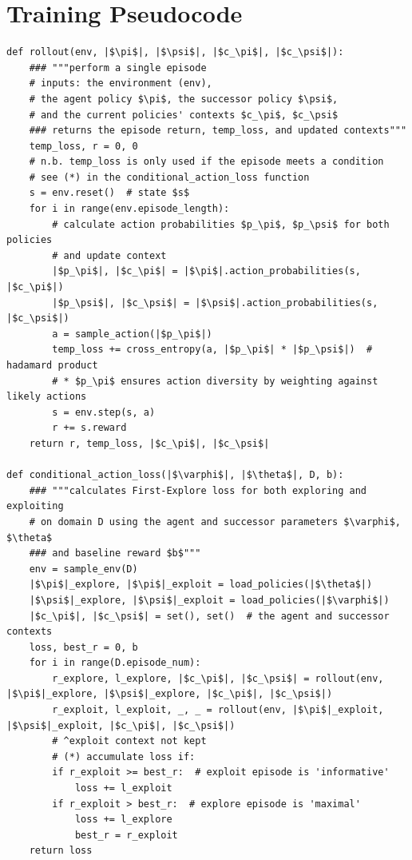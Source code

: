 \documentclass{article}
\begin{document}
\section{Training Pseudocode}
\label{pseudo}
\renewcommand{\listingscaption}{Algorithm}
\begin{listing}[h]
\begin{verbatim}
def rollout(env, |$\pi$|, |$\psi$|, |$c_\pi$|, |$c_\psi$|):
    ### """perform a single episode
    # inputs: the environment (env),
    # the agent policy $\pi$, the successor policy $\psi$,
    # and the current policies' contexts $c_\pi$, $c_\psi$
    ### returns the episode return, temp_loss, and updated contexts"""
    temp_loss, r = 0, 0
    # n.b. temp_loss is only used if the episode meets a condition
    # see (*) in the conditional_action_loss function
    s = env.reset()  # state $s$
    for i in range(env.episode_length):
        # calculate action probabilities $p_\pi$, $p_\psi$ for both policies
        # and update context
        |$p_\pi$|, |$c_\pi$| = |$\pi$|.action_probabilities(s, |$c_\pi$|)
        |$p_\psi$|, |$c_\psi$| = |$\psi$|.action_probabilities(s, |$c_\psi$|)
        a = sample_action(|$p_\pi$|)
        temp_loss += cross_entropy(a, |$p_\pi$| * |$p_\psi$|)  # hadamard product
        # * $p_\pi$ ensures action diversity by weighting against likely actions
        s = env.step(s, a)
        r += s.reward
    return r, temp_loss, |$c_\pi$|, |$c_\psi$|

def conditional_action_loss(|$\varphi$|, |$\theta$|, D, b):
    ### """calculates First-Explore loss for both exploring and exploiting
    # on domain D using the agent and successor parameters $\varphi$, $\theta$
    ### and baseline reward $b$"""
    env = sample_env(D)
    |$\pi$|_explore, |$\pi$|_exploit = load_policies(|$\theta$|)
    |$\psi$|_explore, |$\psi$|_exploit = load_policies(|$\varphi$|)
    |$c_\pi$|, |$c_\psi$| = set(), set()  # the agent and successor contexts
    loss, best_r = 0, b
    for i in range(D.episode_num):
        r_explore, l_explore, |$c_\pi$|, |$c_\psi$| = rollout(env, |$\pi$|_explore, |$\psi$|_explore, |$c_\pi$|, |$c_\psi$|)
        r_exploit, l_exploit, _, _ = rollout(env, |$\pi$|_exploit, |$\psi$|_exploit, |$c_\pi$|, |$c_\psi$|)
        # ^exploit context not kept
        # (*) accumulate loss if:
        if r_exploit >= best_r:  # exploit episode is 'informative'
            loss += l_exploit
        if r_exploit > best_r:  # explore episode is 'maximal'
            loss += l_explore
            best_r = r_exploit
    return loss

\end{verbatim}
\caption{Example First-Explore Cross-Entropy Loss.}
\label{listing:trainfe1}
\end{listing}
\end{document}
